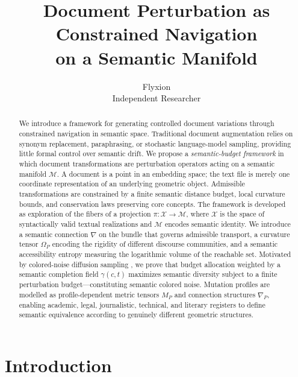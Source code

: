 \documentclass[12pt, a4paper]{article}
\title{\textbf{Document Perturbation as Constrained Navigation\\
on a Semantic Manifold}}
\author{Flyxion\\
\small Independent Researcher}
\date{}
\theoremstyle{plain}
\theoremstyle{definition}
\theoremstyle{remark}
\newcommand{\calX}{\mathcal{X}}
\newcommand{\calM}{\mathcal{M}}
\newcommand{\vpi}{\pi}
\newcommand{\connD}{\nabla}
\newcommand{\curv}{\Omega}
\begin{document}
\maketitle
\thispagestyle{empty}

\begin{abstract}
\noindent
We introduce a framework for generating controlled document variations through
constrained navigation in semantic space.  Traditional document augmentation
relies on synonym replacement, paraphrasing, or stochastic language-model
sampling, providing little formal control over semantic drift.  We propose a
\emph{semantic-budget framework} in which document transformations are
perturbation operators acting on a semantic manifold $\calM$.  A document is
a point in an embedding space; the text file is merely one coordinate
representation of an underlying geometric object.  Admissible transformations
are constrained by a finite semantic distance budget, local curvature bounds,
and conservation laws preserving core concepts.  The framework is developed as
exploration of the fibers of a projection $\vpi : \calX \to \calM$, where
$\calX$ is the space of syntactically valid textual realizations and $\calM$
encodes semantic identity.  We introduce a semantic connection $\connD$ on the
bundle that governs admissible transport, a curvature tensor $\curv_P$ encoding
the rigidity of different discourse communities, and a semantic accessibility
entropy measuring the logarithmic volume of the reachable set.  Motivated by
colored-noise diffusion sampling \cite{davidson2026colorednoisediffusionsampling},
we prove that budget allocation weighted by a semantic completion field
$\gamma(c,t)$ maximizes semantic diversity subject to a finite perturbation
budget---constituting semantic colored noise.  Mutation profiles are modelled as
profile-dependent metric tensors $M_P$ and connection structures $\connD_P$,
enabling academic, legal, journalistic, technical, and literary registers to
define semantic equivalence according to genuinely different geometric structures.
\end{abstract}

\newpage
\tableofcontents
\newpage

\section{Introduction}
\label{sec:intro}
\end{document}
